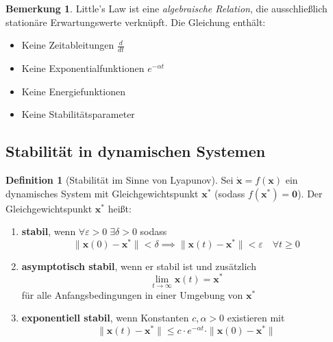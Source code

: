 ﻿\documentclass[a4paper,12pt]{report}
\theoremstyle{definition}
\newtheorem{definition}{Definition}[section]
\newtheorem{bemerkung}{Bemerkung}[section]
\begin{document}
\begin{bemerkung}
	Little's Law ist eine \textit{algebraische Relation}, die ausschließlich stationäre Erwartungswerte verknüpft. Die Gleichung enthält:
	\begin{itemize}
		\item[-] Keine Zeitableitungen $\frac{d}{dt}$
		\item[-] Keine Exponentialfunktionen $e^{-\alpha t}$
		\item[-] Keine Energiefunktionen
		\item[-] Keine Stabilitätsparameter
	\end{itemize}
\end{bemerkung}

\subsection{Stabilität in dynamischen Systemen}

\begin{definition}[Stabilität im Sinne von Lyapunov]
\label{def:stabilitaet}
	Sei $\dot{\mathbf{x}} = f(\mathbf{x})$ ein dynamisches System mit Gleichgewichtspunkt $\mathbf{x}^*$ (sodass $f(\mathbf{x}^*) = \mathbf{0}$). Der Gleichgewichtspunkt $\mathbf{x}^*$ heißt:
	\begin{enumerate}
		\item[-] \textbf{stabil}, wenn $\forall \varepsilon > 0 \; \exists \delta > 0$ sodass
		\begin{equation}
			\|\mathbf{x}(0) - \mathbf{x}^*\| < \delta \implies \|\mathbf{x}(t) - \mathbf{x}^*\| < \varepsilon \quad \forall t \geq 0
		\end{equation}
		
		\item[-] \textbf{asymptotisch stabil}, wenn er stabil ist und zusätzlich
		\begin{equation}
			\lim_{t \to \infty} \mathbf{x}(t) = \mathbf{x}^* 
		\end{equation}
		für alle Anfangsbedingungen in einer Umgebung von $\mathbf{x}^*$
		
		\item[-] \textbf{exponentiell stabil}, wenn Konstanten $c, \alpha > 0$ existieren mit
		\begin{equation}
			\|\mathbf{x}(t) - \mathbf{x}^*\| \leq c \cdot e^{-\alpha t} \cdot \|\mathbf{x}(0) - \mathbf{x}^*\|
		\end{equation}
	\end{enumerate}
\end{definition}
\end{document}
